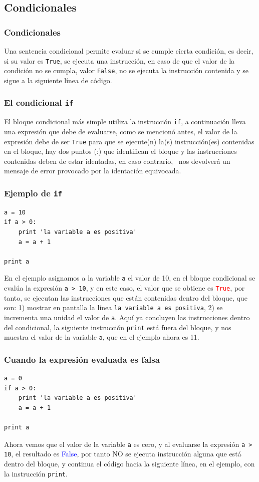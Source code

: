 \subsection{Condicionales}
\begin{frame}
\frametitle{Condicionales}
Una sentencia condicional permite evaluar si se cumple cierta condición, es decir, si su valor es \texttt{True}, se ejecuta una instrucción, en caso de que el valor de la condición no se cumpla, valor \texttt{False}, no se ejecuta la instrucción contenida y se sigue a la siguiente línea de código.
\end{frame}
\begin{frame}
\frametitle{El condicional \texttt{if}}
El bloque condicional más simple utiliza la instrucción \texttt{if}, a continuación lleva una expresión que debe de evaluarse, como se mencionó antes, el valor de la expresión debe de ser \texttt{True} para que se ejecute(n) la(s) instrucción(es) contenidas en el bloque, hay dos puntos (:) que identifican el bloque y las instrucciones contenidas deben de estar identadas, en caso contrario, \python\ nos devolverá un mensaje de error provocado por la identación equivocada.
\end{frame}
\begin{frame}[fragile]
\frametitle{Ejemplo de \texttt{if}}
\begin{lstlisting}
a = 10
if a > 0:
    print 'la variable a es positiva'
    a = a + 1

print a
\end{lstlisting}
\fontsize{12}{12}\selectfont
En el ejemplo asignamos a la variable \texttt{a} el valor de 10, en el bloque condicional se evalúa la expresión \texttt{a > 10}, y en este caso, el valor que se obtiene es \textcolor{red}{\texttt{True}}, por tanto, se ejecutan las instrucciones que están contenidas dentro del bloque, que son: 1) mostrar en pantalla la línea \texttt{la variable a es positiva}, 2) se incrementa una unidad el valor de \texttt{a}. Aquí ya concluyen las instrucciones dentro del condicional, la siguiente instrucción \texttt{print} está fuera del bloque, y nos muestra el valor de la variable \texttt{a}, que en el ejemplo ahora es 11.
\end{frame}
\begin{frame}[fragile]
\frametitle{Cuando la expresión evaluada es falsa}
\begin{lstlisting}
a = 0
if a > 0:
    print 'la variable a es positiva'
    a = a + 1

print a
\end{lstlisting}
Ahora vemos que el valor de la variable \texttt{a} es cero, y al evaluarse la expresión \texttt{a > 10}, el resultado es \textcolor{blue}{False}, por tanto NO se ejecuta instrucción alguna que está dentro del bloque, y continua el código hacia la siguiente línea, en el ejemplo, con la instrucción \texttt{print}.
\end{frame}
